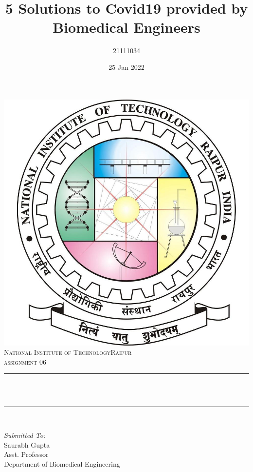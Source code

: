 \documentclass[12pt]{article}
\title{5 Solutions to Covid19 provided by Biomedical Engineers}								%
\author{21111034}								%
\date{25 Jan 2022}											%
\makeatletter
\let\thetitle\@title
\makeatother
\begin{document}

\begin{titlepage}
	\centering
    \vspace*{0.5 cm}
    \includegraphics[scale = 0.20]{logo.jpeg}\\[1.0 cm]	%
    \textsc{\LARGE  National Institute of Technology\newline\newline Raipur}\\[2.0 cm]	%
	\textsc{\Large assignment 06}\\[0.5 cm]				%
	\rule{\linewidth}{0.2 mm} \\[0.4 cm]
	{ \huge \bfseries \thetitle}\\
	\rule{\linewidth}{0.2 mm} \\[1.0 cm]
	
	\begin{minipage}{0.4\textwidth}
		\begin{flushleft} \large
			\emph{Submitted To:}\\
			Saurabh Gupta\\
            Asst. Professor\\
            Department of Biomedical Engineering\\
			\end{flushleft}
			\end{minipage}~
			\begin{minipage}{0.4\textwidth}
            

\end{minipage}
\end{titlepage}
\end{document}
